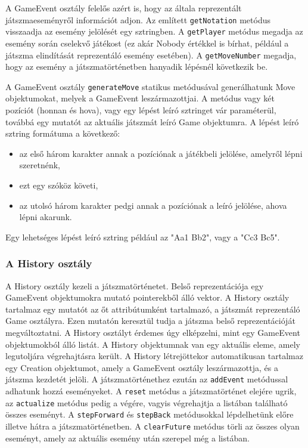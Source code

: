 \documentclass[12pt, twoside]{report}
\begin{document}
A GameEvent osztály felelős azért is, hogy az általa reprezentált játszmaeseményről információt adjon. Az említett {\tt getNotation} metódus visszaadja az esemény jelölését egy sztringben. A {\tt getPlayer} metódus megadja az esemény során cselekvő játékost (ez akár Nobody értékkel is bírhat, például a játszma elindítását reprezentáló esemény esetében). A {\tt getMoveNumber} megadja, hogy az esemény a játszmatörténetben hanyadik lépésnél következik be.

A GameEvent osztály {\tt generateMove} statikus metódusával generálhatunk Move objektumokat, melyek a GameEvent leszármazottjai. A metódus vagy két pozíciót (honnan és hova), vagy egy lépést leíró sztringet vár paraméterül, továbbá egy mutatót az aktuális játszmát leíró Game objektumra. A lépést leíró sztring formátuma a következő:
\begin{itemize}
	\item az első három karakter annak a pozíciónak a játékbeli jelölése, amelyről lépni szeretnénk,
	\item ezt egy szóköz követi,
	\item az utolsó három karakter pedgi annak a pozíciónak a leíró jelölése, ahova lépni akarunk.
\end{itemize}
Egy lehetséges lépést leíró sztring például az "Aa1 Bb2", vagy a "Cc3 Bc5".

\subsubsection{A History osztály}

A History osztály kezeli a játszmatörténetet. Belső reprezentációja egy GameEvent objektumokra mutató pointerekből álló vektor. A History osztály tartalmaz egy mutatót az őt attribútumként tartalmazó, a játszmát reprezentáló Game osztályra. Ezen mutatón keresztül tudja a játszma belső reprezentációját megváltoztatni. A History osztályt érdemes úgy elképzelni, mint egy GameEvent objektumokból álló listát. A History objektumnak van egy aktuális eleme, amely legutoljára végrehajtásra került. A History létrejöttekor automatikusan tartalmaz egy Creation objektumot, amely a GameEvent osztály leszármazottja, és a játszma kezdetét jelöli. A játszmatörténethez ezután az {\tt addEvent} metódussal adhatunk hozzá eseményeket. A {\tt reset} metódus a játszmatörténet elejére ugrik, az {\tt actualize} metódus pedig a végére, vagyis végrehajtja a listában található összes eseményt. A {\tt stepForward} és {\tt stepBack} metódusokkal lépdelhetünk előre illetve hátra a játszmatörténetben. A {\tt clearFuture} metódus törli az összes olyan eseményt, amely az aktuális esemény után szerepel még a listában.
\end{document}
